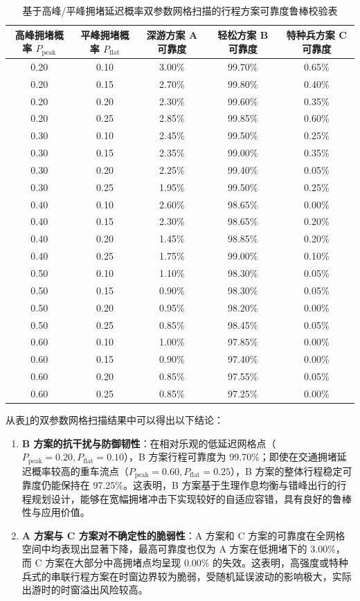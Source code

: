 \documentclass{cumcmthesis}
\begin{document}
\begin{table}[htbp]
\centering
\caption{基于高峰/平峰拥堵延迟概率双参数网格扫描的行程方案可靠度鲁棒校验表}
\label{tab:sensitivity_grid}
\small
\begin{tabular}{ccccc}
\toprule
高峰拥堵概率 $P_{\text{peak}}$ & 平峰拥堵概率 $P_{\text{flat}}$ & 深游方案 A 可靠度 & 轻松方案 B 可靠度 & 特种兵方案 C 可靠度 \\
\midrule
0.20 & 0.10 & 3.00\% & 99.70\% & 0.65\% \\
0.20 & 0.15 & 2.70\% & 99.80\% & 0.40\% \\
0.20 & 0.20 & 2.30\% & 99.60\% & 0.35\% \\
0.20 & 0.25 & 2.85\% & 99.85\% & 0.60\% \\
\midrule
0.30 & 0.10 & 2.45\% & 99.50\% & 0.25\% \\
0.30 & 0.15 & 2.35\% & 99.00\% & 0.35\% \\
0.30 & 0.20 & 2.25\% & 99.40\% & 0.05\% \\
0.30 & 0.25 & 1.95\% & 99.50\% & 0.25\% \\
\midrule
0.40 & 0.10 & 2.60\% & 98.65\% & 0.00\% \\
0.40 & 0.15 & 2.30\% & 98.65\% & 0.20\% \\
0.40 & 0.20 & 1.45\% & 98.85\% & 0.20\% \\
0.40 & 0.25 & 1.75\% & 99.00\% & 0.10\% \\
\midrule
0.50 & 0.10 & 1.10\% & 98.30\% & 0.05\% \\
0.50 & 0.15 & 0.90\% & 98.30\% & 0.05\% \\
0.50 & 0.20 & 0.95\% & 98.20\% & 0.00\% \\
0.50 & 0.25 & 0.85\% & 98.45\% & 0.05\% \\
\midrule
0.60 & 0.10 & 1.00\% & 97.85\% & 0.00\% \\
0.60 & 0.15 & 0.90\% & 97.40\% & 0.00\% \\
0.60 & 0.20 & 0.85\% & 97.55\% & 0.05\% \\
0.60 & 0.25 & 0.85\% & 97.25\% & 0.00\% \\
\bottomrule
\end{tabular}
\end{table}

从表\ref{tab:sensitivity_grid}的双参数网格扫描结果中可以得出以下结论：
\begin{enumerate}
\item \textbf{B 方案的抗干扰与防御韧性}：在相对乐观的低延迟网格点（$P_{\text{peak}}=0.20, P_{\text{flat}}=0.10$），B 方案行程可靠度为 99.70\%；即使在交通拥堵延迟概率较高的重车流点（$P_{\text{peak}}=0.60, P_{\text{flat}}=0.25$），B 方案的整体行程稳定可靠度仍能保持在 97.25\%。这表明，B 方案基于生理作息均衡与错峰出行的行程规划设计，能够在宽幅拥堵冲击下实现较好的自适应容错，具有良好的鲁棒性与应用价值。
\item \textbf{A 方案与 C 方案对不确定性的脆弱性}：A 方案和 C 方案的可靠度在全网格空间中均表现出显著下降，最高可靠度也仅为 A 方案在低拥堵下的 3.00\%，而 C 方案在大部分中高拥堵点均呈现 0.00\% 的失效。这表明，高强度或特种兵式的串联行程方案在时窗边界较为脆弱，受随机延误波动的影响极大，实际出游时的时窗溢出风险较高。
\end{enumerate}
\end{document}
